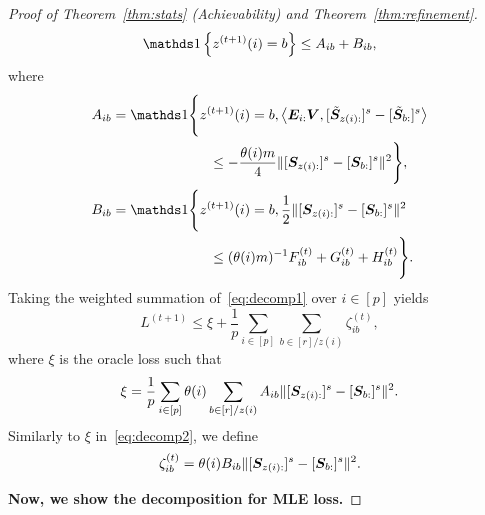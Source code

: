 \documentclass[journal]{IEEEtran}
\theoremstyle{definition}
\theoremstyle{definition}
\newcommand{\offf}[1]{\left\{#1\right\}}
\newcommand{\ang}[1]{\left\langle#1\right\rangle}
\begin{document}
\begin{proof}[Proof of Theorem~\ref{thm:stats} (Achievability) and Theorem~\ref{thm:refinement}]
\begin{equation}
        \ind \offf{ z^{(t+1)}(i) = b  } \leq A_{ib} + B_{ib},
    \end{equation}
    where 
    \small
    \begin{align}
        A_{ib} &= \ind \Bigg\{z^{(t+1)}(i) = b, \ang{ \mE_{i:} \mV, [  \tilde \mS_{z(i):} ]^s - [  \tilde \mS_{b:} ]^s }  \\
        & \quad \quad \quad \quad \quad \quad \quad \leq - \frac{\theta(i) m}{4} \onormSize{}{ [ \mS_{z(i):}  ]^s - [ \mS_{b:}  ]^s  }^2 \Bigg\},\\
        B_{ib} &= \ind \Bigg\{z^{(t+1)}(i) = b, \frac{1}{2}\onormSize{}{ [ \mS_{z(i):}  ]^s - [ \mS_{b:}  ]^s  }^2 \\
        & \quad \quad \quad \quad \quad \quad \quad  \leq (\theta(i) m)^{-1} F_{ib}^{(t)} + G_{ib}^{(t)} + H_{ib}^{(t)} \Bigg\}.
    \end{align}
    \normalsize
 Taking the weighted summation of~\eqref{eq:decomp1} over $i \in [p]$ yields 
    \begin{equation}
        L^{(t+1)} \leq \xi + \frac{1}{p}\sum_{i \in [p] }  \sum_{b \in [r]/z(i)}  \zeta_{ib}^{(t)}, 
    \end{equation}
    where $\xi$ is the oracle loss such that 
    \begin{equation}\label{eq:decomp2}
        \xi =   \frac{1}{p} \sum_{i \in [p] } \theta(i) \sum_{b \in [r]/z(i)} A_{ib} \onormSize{}{ [ \mS_{ z(i):}  ]^s - [ \mS_{b:}  ]^s  }^2.
    \end{equation}
    Similarly to $\xi$ in~\eqref{eq:decomp2}, we define
    \begin{equation}
        \zeta_{ib}^{(t)} =   \theta(i) B_{ib} \lVert [ \bm S_{ z(i):}  ]^s - [ \bm S_{b:}  ]^s  \rVert^2.
    \end{equation}
    
    {
      
    
    \textbf{Now, we show the decomposition for MLE loss.}
     
}
\end{proof}
\end{document}
